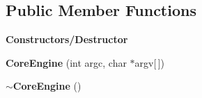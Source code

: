 \subsection*{Public Member Functions}
\begin{Indent}\textbf{ Constructors/\+Destructor}\par
\begin{DoxyCompactItemize}
\item 
\mbox{\label{classrev_1_1_core_engine_a321f652e65171ed8ade4806d9968dfe1}} 
{\bfseries Core\+Engine} (int argc, char $\ast$argv\mbox{[}$\,$\mbox{]})
\item 
\mbox{\label{classrev_1_1_core_engine_ae879a35662f745ba38825e0b07af5580}} 
{\bfseries $\sim$\+Core\+Engine} ()
\end{DoxyCompactItemize}
\end{Indent}
